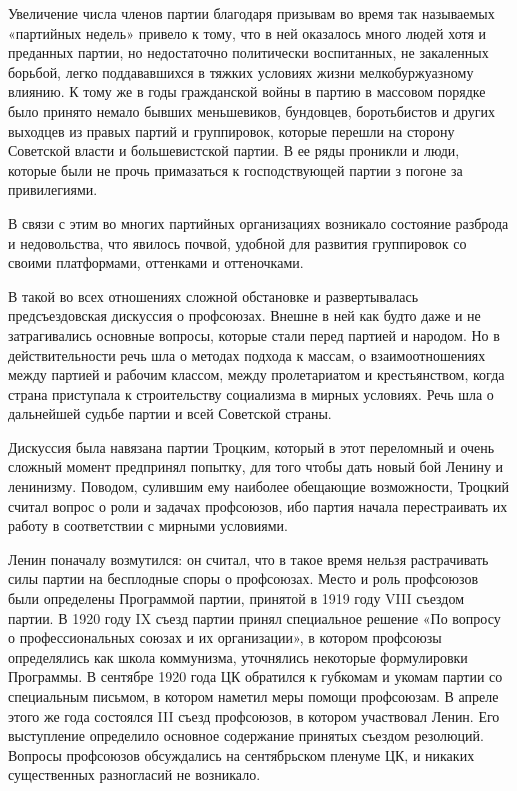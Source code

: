 \documentclass[12pt, a4paper, openany]{book}
\begin{document}
Увеличение числа членов партии благодаря призывам во время так называемых «партийных недель» привело к тому, что в ней оказалось много людей хотя и преданных партии, но недостаточно политически воспитанных, не закаленных борьбой, легко поддававшихся в тяжких условиях жизни мелкобуржуазному влиянию. К тому же в годы гражданской войны в партию в массовом порядке было принято немало бывших меньшевиков, бундовцев, боротьбистов и других выходцев из правых партий и группировок, которые перешли на сторону Советской власти и большевистской партии. В ее ряды проникли и люди, которые были не прочь примазаться к господствующей партии з погоне за привилегиями.

В связи с этим во многих партийных организациях возникало состояние разброда и недовольства, что явилось почвой, удобной для развития группировок со своими платформами, оттенками и оттеночками.

В такой во всех отношениях сложной обстановке и развертывалась предсъездовская дискуссия о профсоюзах. Внешне в ней как будто даже и не затрагивались основные вопросы, которые стали перед партией и народом. Но в действительности речь шла о методах подхода к массам, о взаимоотношениях между партией и рабочим классом, между пролетариатом и крестьянством, когда страна приступала к строительству социализма в мирных условиях. Речь шла о дальнейшей судьбе партии и всей Советской страны.

Дискуссия была навязана партии Троцким, который в этот переломный и очень сложный момент предпринял попытку, для того чтобы дать новый бой Ленину и ленинизму. Поводом, сулившим ему наиболее обещающие возможности, Троцкий считал вопрос о роли и задачах профсоюзов, ибо партия начала перестраивать их работу в соответствии с мирными условиями.

Ленин поначалу возмутился: он считал, что в такое время нельзя растрачивать силы партии на бесплодные споры о профсоюзах. Место и роль профсоюзов были определены Программой партии, принятой в 1919 году VIII съездом партии. В 1920 году IX съезд партии принял специальное решение «По вопросу о профессиональных союзах и их организации», в котором профсоюзы определялись как школа коммунизма, уточнялись некоторые формулировки Программы. В сентябре 1920 года ЦК обратился к губкомам и укомам партии со специальным письмом, в котором наметил меры помощи профсоюзам. В апреле этого же года состоялся III съезд профсоюзов, в котором участвовал Ленин. Его выступление определило основное содержание принятых съездом резолюций. Вопросы профсоюзов обсуждались на сентябрьском пленуме ЦК, и никаких существенных разногласий не возникало.
\end{document}
